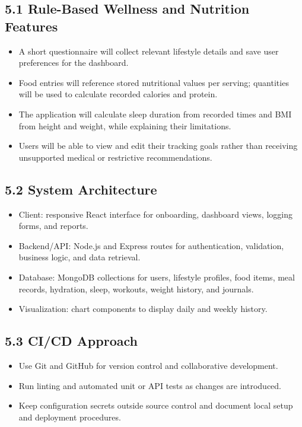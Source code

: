 \documentclass[11pt,a4paper]{article}
\begin{document}
\subsection*{5.1 Rule-Based Wellness and Nutrition Features}
\begin{itemize}
\item A short questionnaire will collect relevant lifestyle details and save user preferences for the dashboard.
\item Food entries will reference stored nutritional values per serving; quantities will be used to calculate recorded calories and protein.
\item The application will calculate sleep duration from recorded times and BMI from height and weight, while explaining their limitations.
\item Users will be able to view and edit their tracking goals rather than receiving unsupported medical or restrictive recommendations.
\end{itemize}
\subsection*{5.2 System Architecture}
\begin{itemize}
\item Client: responsive React interface for onboarding, dashboard views, logging forms, and reports.
\item Backend/API: Node.js and Express routes for authentication, validation, business logic, and data retrieval.
\item Database: MongoDB collections for users, lifestyle profiles, food items, meal records, hydration, sleep, workouts, weight history, and journals.
\item Visualization: chart components to display daily and weekly history.
\end{itemize}
\subsection*{5.3 CI/CD Approach}
\begin{itemize}
\item Use Git and GitHub for version control and collaborative development.
\item Run linting and automated unit or API tests as changes are introduced.
\item Keep configuration secrets outside source control and document local setup and deployment procedures.
\end{itemize}
\end{document}
